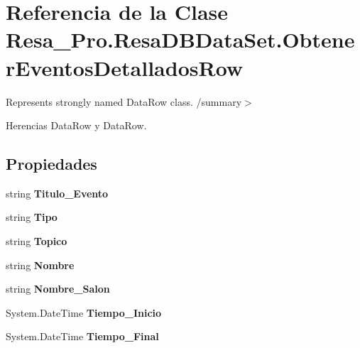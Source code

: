 \section{Referencia de la Clase Resa\+\_\+\+Pro.\+Resa\+D\+B\+Data\+Set.\+Obtener\+Eventos\+Detallados\+Row}
\label{class_resa___pro_1_1_resa_d_b_data_set_1_1_obtener_eventos_detallados_row}


Represents strongly named Data\+Row class. /summary$>$  




Herencias Data\+Row y Data\+Row.

\subsection*{Propiedades}
\begin{DoxyCompactItemize}
\item 
string {\bfseries Titulo\+\_\+\+Evento}\hspace{0.3cm}{\ttfamily  [get, set]}\label{class_resa___pro_1_1_resa_d_b_data_set_1_1_obtener_eventos_detallados_row_a095b89798b440de1cd6247ce032ae9df}

\item 
string {\bfseries Tipo}\hspace{0.3cm}{\ttfamily  [get, set]}\label{class_resa___pro_1_1_resa_d_b_data_set_1_1_obtener_eventos_detallados_row_aca186957fd0d4c6f2d91166335b3ca0a}

\item 
string {\bfseries Topico}\hspace{0.3cm}{\ttfamily  [get, set]}\label{class_resa___pro_1_1_resa_d_b_data_set_1_1_obtener_eventos_detallados_row_a4ad7821be7f4ad110fbccd3154e34d37}

\item 
string {\bfseries Nombre}\hspace{0.3cm}{\ttfamily  [get, set]}\label{class_resa___pro_1_1_resa_d_b_data_set_1_1_obtener_eventos_detallados_row_a1a85ef7e6e759f916842f9774d2f0dbf}

\item 
string {\bfseries Nombre\+\_\+\+Salon}\hspace{0.3cm}{\ttfamily  [get, set]}\label{class_resa___pro_1_1_resa_d_b_data_set_1_1_obtener_eventos_detallados_row_add374b7913fb047d2f63524eae42f084}

\item 
System.\+Date\+Time {\bfseries Tiempo\+\_\+\+Inicio}\hspace{0.3cm}{\ttfamily  [get, set]}\label{class_resa___pro_1_1_resa_d_b_data_set_1_1_obtener_eventos_detallados_row_aadd7bdcd218ece55bc56b88b14664c7f}

\item 
System.\+Date\+Time {\bfseries Tiempo\+\_\+\+Final}\hspace{0.3cm}{\ttfamily  [get, set]}\label{class_resa___pro_1_1_resa_d_b_data_set_1_1_obtener_eventos_detallados_row_a94c1ef685c2cb3833a9f91e2a4599800}

\end{DoxyCompactItemize}


